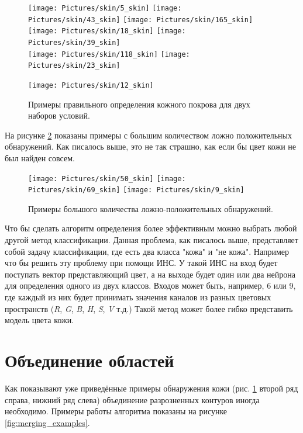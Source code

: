 \documentclass[12pt]{report}
\begin{document}
\begin{figure}[p]
	\centering	
	\texttt{[image: Pictures/skin/5\_skin]}\hspace{0.2cm}
	\texttt{[image: Pictures/skin/43\_skin]}\hspace{0.2cm}
	\texttt{[image: Pictures/skin/165\_skin]}
	\\[0.5cm]
	\texttt{[image: Pictures/skin/18\_skin]}\hspace{0.2cm}
	\texttt{[image: Pictures/skin/39\_skin]}
	\\[0.5cm]
	\texttt{[image: Pictures/skin/118\_skin]}\hspace{0.2cm}
	\texttt{[image: Pictures/skin/23\_skin]}
	
	\texttt{[image: Pictures/skin/12\_skin]}
	\caption{Примеры правильного определения кожного покрова для двух наборов условий.}	
	\label{fig:skin_contour_samples}
\end{figure}

На рисунке \ref{fig:many_false_possitives} показаны примеры с большим количеством ложно положительных обнаружений. 
Как писалось выше, это не так страшно, как если бы цвет кожи не был найден совсем.
\begin{figure}[h]
	\centering	
	\texttt{[image: Pictures/skin/50\_skin]}\hspace{0.2cm}
	\texttt{[image: Pictures/skin/69\_skin]}\hspace{0.2cm}
	\texttt{[image: Pictures/skin/9\_skin]}\hspace{0.2cm}
		
	\caption{Примеры большого количества ложно-положительных обнаружений.}	
	\label{fig:many_false_possitives}
\end{figure}

Что бы сделать алгоритм определения более эффективным можно выбрать любой другой метод классификации. Данная 
проблема, как писалось выше, представляет собой задачу классификации, где есть два класса "кожа" и "не кожа". 
Например что бы решить эту проблему при помощи ИНС. У такой ИНС на вход будет поступать вектор представляющий цвет, 
а 
на выходе будет один или два нейрона для определения одного из двух классов. Входов может быть, например, 6 или 9, 
где каждый из них будет принимать значения каналов из разных цветовых пространств (\textit{R}, \textit{G}, \textit
{B}, \textit{H}, \textit{S}, \textit{V} т.д.) Такой метод может более гибко представить модель цвета кожи.

\section{Объединение областей}
Как показывают уже приведённые примеры обнаружения кожи (рис. \ref{fig:skin_contour_samples} второй ряд справа, 
нижний ряд слева) объединение разрозненных контуров иногда необходимо. Примеры работы алгоритма показаны на рисунке 
\ref{fig:merging_examples}.
\end{document}
